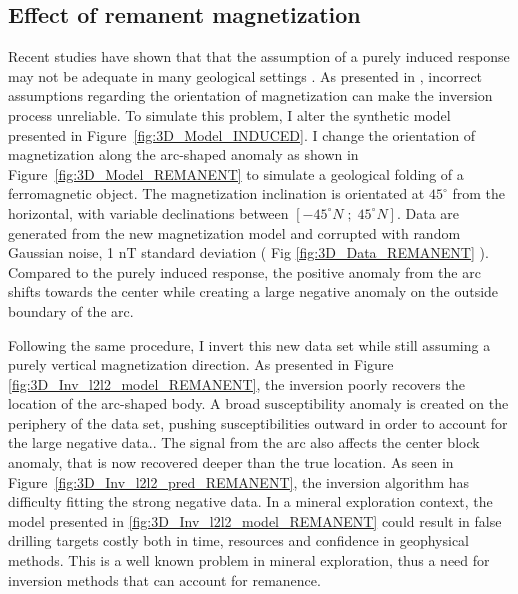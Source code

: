 \subsection{Effect of remanent magnetization}
Recent studies have shown that that the assumption of a purely induced response may not be adequate in many geological settings \cite[]{Buchan09, Enkin2014}. 
As presented in \cite{PhDLelievre09}, incorrect assumptions regarding the orientation of magnetization can make the inversion process unreliable.
To simulate this problem, I alter the synthetic model presented in Figure~\ref{fig:3D_Model_INDUCED}. 
I change the orientation of magnetization along the arc-shaped anomaly as shown in Figure~\ref{fig:3D_Model_REMANENT} to simulate a geological folding of a ferromagnetic object.
The magnetization inclination is orientated at $45^{\circ}$ from the horizontal, with variable declinations between $[-45^{\circ}N \;;\;45^{\circ}N]$.
Data are generated from the new magnetization model and corrupted with random Gaussian noise, 1 nT standard deviation ( Fig \ref{fig:3D_Data_REMANENT} ). 
Compared to the purely induced response, the positive anomaly from the arc shifts towards the center while creating a large negative anomaly on the outside boundary of the arc.

Following the same procedure, I invert this new data set while still assuming a purely vertical magnetization direction. 
As presented in Figure \ref{fig:3D_Inv_l2l2_model_REMANENT}, the inversion poorly recovers the location of the arc-shaped body. 
A broad susceptibility anomaly is created on the periphery of the data set, pushing susceptibilities outward in order to account for the large negative data..
The signal from the arc also affects the center block anomaly, that is now recovered deeper than the true location. 
As seen in Figure~\ref{fig:3D_Inv_l2l2_pred_REMANENT}, the inversion algorithm has difficulty fitting the strong negative data. 
In a mineral exploration context, the model presented in \ref{fig:3D_Inv_l2l2_model_REMANENT} could result in false drilling targets \textemdash costly both in time, resources and confidence in geophysical methods.
This is a well known problem in mineral exploration, thus a need for inversion methods that can account for remanence.


